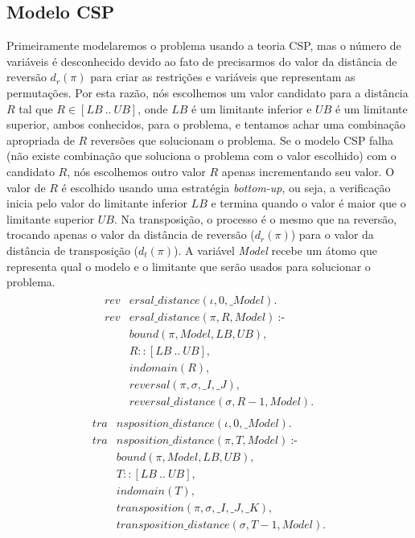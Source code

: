 \subsection{Modelo CSP}
\label{subsec:modelcsp}
Primeiramente modelaremos o problema usando a teoria CSP, mas o número
de variáveis é desconhecido devido ao fato de precisarmos do valor da
distância de reversão $d_{r}(\pi)$ para criar as restrições e variáveis
que representam as permutações. Por esta razão, nós escolhemos um valor
candidato para a distância $R$ tal que $R \in [LB~..~UB]$, onde $LB$ é
um limitante inferior e $UB$ é um limitante superior, ambos conhecidos,
para o problema, e tentamos achar uma combinação apropriada de $R$
reversões que solucionam o problema. Se o modelo CSP falha (não existe
combinação que soluciona o problema com o valor escolhido) com o
candidato $R$, nós escolhemos outro valor $R$ apenas incrementando seu
valor. O valor de $R$ é escolhido usando uma estratégia
\textit{bottom-up}, ou seja, a verificação inicia pelo valor do
limitante inferior $LB$ e termina quando o valor é maior que o limitante
superior $UB$. Na transposição, o processo é o mesmo que na reversão,
trocando apenas o valor da distância de reversão ($d_{r}(\pi)$) para o
valor da distância de transposição ($d_{t}(\pi)$). A variável
\textit{Model} recebe um átomo que representa qual o modelo e o limitante
que serão usados para solucionar o problema.
\begin{align}
  \label{revdistance}
  \begin{split}
  \textit{rev}&\textit{ersal\_distance}(\iota, 0, \_Model). \\
  \textit{rev}&\textit{ersal\_distance}(\pi, R, Model)~\text{:-} \\
  &\textit{bound}(\pi, Model, LB, UB), \\
  &R :: [LB~..~UB], \\
  &\textit{indomain}(R),  \\
  &\textit{reversal}(\pi, \sigma, \_I, \_J),  \\
  &\textit{reversal\_distance}(\sigma, R-1, Model). 
  \end{split}
\end{align}
\begin{align}
  \label{tradistance}
  \begin{split}
  \textit{tra}&\textit{nsposition\_distance}(\iota, 0, \_Model). \\
  \textit{tra}&\textit{nsposition\_distance}(\pi, T, Model)~\text{:-} \\
  &\textit{bound}(\pi, Model, LB, UB), \\
  &T :: [LB~..~UB], \\
  &\textit{indomain}(T),  \\
  &\textit{transposition}(\pi, \sigma, \_I, \_J, \_K),  \\
  &\textit{transposition\_distance}(\sigma, T-1, Model). 
  \end{split}
\end{align}

